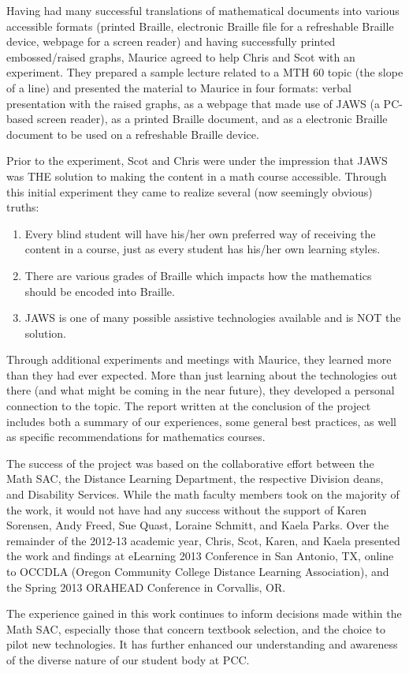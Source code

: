 Having had many successful translations of mathematical documents into various accessible
formats (printed Braille, electronic Braille file for a refreshable Braille device, webpage
for a screen reader) and having successfully printed embossed/raised graphs, Maurice agreed
to help Chris and Scot with an experiment.  They prepared a sample lecture related to a MTH 60 topic (the
slope of a line) and presented the material to Maurice in four formats: verbal presentation
with the raised graphs, as a webpage that made use of JAWS (a PC-based screen reader), as
a printed Braille document, and as a electronic Braille document to be used on a refreshable Braille device. 

Prior to the experiment, Scot and Chris were under the impression that JAWS was THE solution to
making the content in a math course accessible.  Through this initial experiment they came to
realize several (now seemingly obvious) truths:
\begin{enumerate}
	\item  Every blind student will have his/her own preferred way of receiving the content in a
	course, just as every student has his/her own learning styles.
	\item There are various grades of Braille which impacts how the mathematics should be encoded into Braille.
	\item JAWS is one of many possible assistive technologies available and is NOT the solution.
\end{enumerate}

Through additional experiments and meetings with Maurice, they learned more than they had ever expected. 
More than just learning about the technologies out there (and what might be coming in the near future),
they developed a personal connection to the topic.  The report written at the conclusion of the project \cite{accessibilityproject}
includes both a summary of our experiences, some general best practices, as well as specific recommendations for mathematics courses.

The success of the project was based on the collaborative effort between the Math SAC, the Distance
Learning Department, the respective Division deans,  and Disability Services.  While the math faculty members took on the majority
of the work, it would not have had any success without the support of Karen Sorensen, Andy Freed, Sue Quast, Loraine Schmitt,
and Kaela Parks.  Over the remainder of the 2012-13 academic year, Chris, Scot, Karen, and Kaela
presented the work and findings at eLearning 2013 Conference in San Antonio, TX, online to OCCDLA
(Oregon Community College Distance Learning Association), and the Spring 2013 ORAHEAD Conference in Corvallis, OR. 

The experience gained in this work continues to inform decisions made within the Math SAC, especially those that concern textbook selection,
and the choice to pilot new technologies. It has further enhanced our understanding and awareness of the diverse nature of our student body at PCC.
